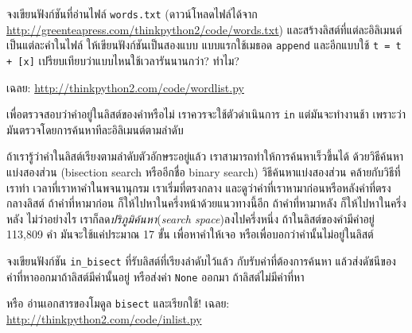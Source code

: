 \begin{exercise}

จงเขียนฟังก์ชันที่อ่านไฟล์ \texttt{words.txt} (ดาวน์โหลดไฟล์ได้จาก \url{http://greenteapress.com/thinkpython2/code/words.txt}) และสร้างลิสต์ที่แต่ละอิลิเมนต์เป็นแต่ละคำในไฟล์
ให้เขียนฟังก์ชันเป็นสองแบบ
แบบแรกใช้เมธอด \texttt{append}
และอีกแบบใช้ \texttt{t = t + [x]}
เปรียบเทียบว่าแบบไหนใช้เวลารันนานกว่า? ทำไม?

เฉลย: \url{http://thinkpython2.com/code/wordlist.py}

\end{exercise}
\vspace{0.5cm}


\begin{exercise}
\label{wordlist1}
\label{bisection}

เพื่อตรวจสอบว่าคำอยู่ในลิสต์ของคำหรือไม่
เราควรจะใช้ตัวดำเนินการ \texttt{in}
แต่มันจะทำงานช้า เพราะว่ามันตรวจโดยการค้นหาทีละอิลิเมนต์ตามลำดับ

ถ้าเรารู้ว่าคำในลิสต์เรียงตามลำดับตัวอักษระอยู่แล้ว
เราสามารถทำให้การค้นหาเร็วขึ้นได้
ด้วยวิธีค้นหาแบ่งสองส่วน (bisection search หรืออีกชื่อ binary search)
วิธีค้นหาแบ่งสองส่วน คล้ายกับวิธีที่เราทำ เวลาที่เราหาคำในพจนานุกรม
เราเริ่มที่ตรงกลาง และดูว่าคำที่เราหามาก่อนหรือหลังคำที่ตรงกลางลิสต์
ถ้าคำที่หามาก่อน ก็ให้ไปหาในครึ่งหน้าด้วยแนวทางนี้อีก
ถ้าคำที่หามาหลัง ก็ให้ไปหาในครึ่งหลัง
ไม่ว่าอย่างไร เราก็ลด\textit{ปริภูมิค้นหา}(\textit{search space})ลงไปครึ่งหนึ่ง
ถ้าในลิสต์ของคำมีคำอยู่ 113,809 คำ มันจะใช้แค่ประมาณ 17 ขั้น เพื่อหาคำให้เจอ หรือเพื่อบอกว่าคำนั้นไม่อยู่ในลิสต์

จงเขียนฟังก์ชัน \verb|in_bisect| ที่รับลิสต์ที่เรียงลำดับไว้แล้ว
กับรับค่าที่ต้องการค้นหา
แล้วส่งดัชนีของค่าที่หาออกมาถ้าลิสต์มีค่านั้นอยู่
หรือส่งค่า \texttt{None} ออกมา ถ้าลิสต์ไม่มีค่าที่หา

หรือ อ่านเอกสารของโมดูล \texttt{bisect} และเรียกใช้!  
เฉลย: \url{http://thinkpython2.com/code/inlist.py}

\end{exercise}
\vspace{0.5cm}


